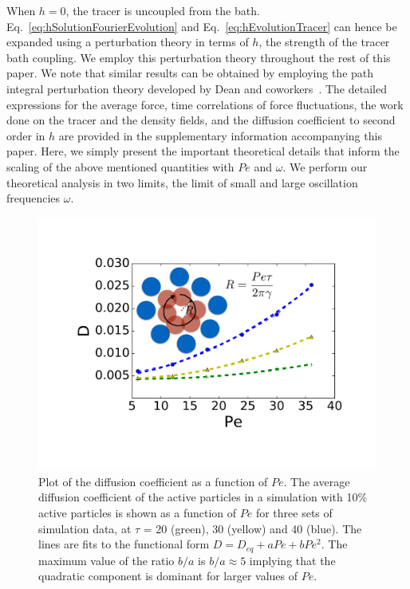 \documentclass[pre,amsmath,preprintnumbers,10pt,article,notitlepage,twocolumn]{revtex4-1}
\begin{document}
When $h=0$, the tracer is uncoupled from the bath. Eq.~\ref{eq:hSolutionFourierEvolution} and Eq.~\ref{eq:hEvolutionTracer} can hence be expanded using a perturbation theory in terms of $h$, the strength of the tracer bath coupling. We employ this perturbation theory throughout the rest of this paper. We note that similar results can be obtained by employing the path integral perturbation theory developed by Dean and coworkers~\cite{Demery2014}. The detailed expressions for the average force, time correlations of force fluctuations, the work done on the tracer and the density fields, and the diffusion coefficient to second order in $h$ are provided in the supplementary information accompanying this paper. Here, we simply present the important theoretical details that inform the scaling of the above mentioned quantities with $Pe$ and $\omega$. We perform our theoretical analysis in two limits, the limit of small and large oscillation frequencies $\omega$. 
\begin{figure}[tbp]
\centering
\includegraphics[width=0.85\linewidth]{D_active_vs_Pe_10p4.pdf}
\caption{Plot of the diffusion coefficient as a function of $Pe$. The average diffusion coefficient of the active particles in a simulation with 10\% active particles is shown as a function of $Pe$ for three sets of simulation data, at $\tau$ = 20 (green), 30 (yellow) and 40 (blue). The lines are fits to the functional form $D = D_{eq} + a Pe + b Pe^2$. The maximum value of the ratio $b/a$ is $b/a \approx 5$ implying that the quadratic component is dominant for larger values of $Pe$.} %
\label{fig:diffusion}
\end{figure}
\end{document}
